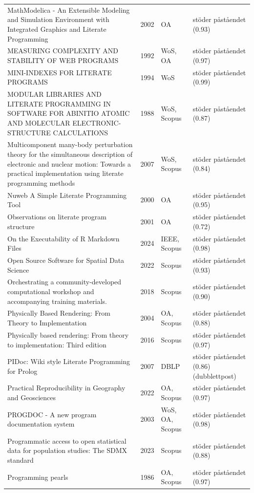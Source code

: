 \begin{longtable}{@{}%
  >{\raggedright\arraybackslash}p{}c%
  >{\raggedright\arraybackslash}p{}%
  >{\raggedright\arraybackslash}p{}@{}}
MathModelica - An Extensible Modeling and Simulation Environment with Integrated Graphics and Literate Programming & 2002 & OA & stöder påståendet (0.93) \\
MEASURING COMPLEXITY AND STABILITY OF WEB PROGRAMS & 1992 & WoS, OA & stöder påståendet (0.97) \\
MINI-INDEXES FOR LITERATE PROGRAMS & 1994 & WoS & stöder påståendet (0.99) \\
MODULAR LIBRARIES AND LITERATE PROGRAMMING IN SOFTWARE FOR ABINITIO ATOMIC AND MOLECULAR ELECTRONIC-STRUCTURE CALCULATIONS & 1988 & WoS, Scopus & stöder påståendet (0.87) \\
Multicomponent many-body perturbation theory for the simultaneous description of electronic and nuclear motion: Towards a practical implementation using literate programming methods & 2007 & WoS, Scopus & stöder påståendet (0.84) \\
Nuweb A Simple Literate Programming Tool & 2000 & OA & stöder påståendet (0.95) \\
Observations on literate program structure & 2001 & OA & stöder påståendet (0.72) \\
On the Executability of R Markdown Files & 2024 & IEEE, Scopus & stöder påståendet (0.98) \\
Open Source Software for Spatial Data Science & 2022 & Scopus & stöder påståendet (0.93) \\
Orchestrating a community-developed computational workshop and accompanying training materials. & 2018 & Scopus & stöder påståendet (0.90) \\
Physically Based Rendering: From Theory to Implementation & 2004 & OA, Scopus & stöder påståendet (0.88) \\
Physically based rendering: From theory to implementation: Third edition & 2016 & Scopus & stöder påståendet (0.97) \\
PIDoc: Wiki style Literate Programming for Prolog & 2007 & DBLP & stöder påståendet (0.86) (dubblettpost) \\
Practical Reproducibility in Geography and Geosciences & 2022 & OA, Scopus & stöder påståendet (0.97) \\
PROGDOC - A new program documentation system & 2003 & WoS, OA, Scopus & stöder påståendet (0.98) \\
Programmatic access to open statistical data for population studies: The SDMX standard & 2023 & Scopus & stöder påståendet (0.88) \\
Programming pearls & 1986 & OA, Scopus & stöder påståendet (0.97) \\

\end{longtable}
